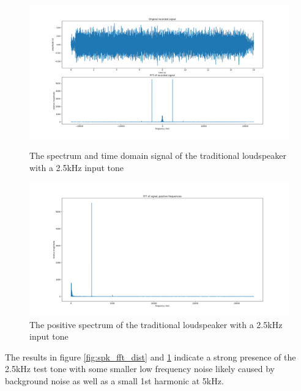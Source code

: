 \begin{figure}[ht!]
    \centering
    \begin{minipage}{0.49\textwidth}
        \centering
        \includegraphics[width=\textwidth]{Figures/Testing/Distortion/Spk_fft_sig.png}
        \caption{The spectrum and time domain signal of the traditional loudspeaker with a 2.5kHz input tone}
        \label{fig:spk_fft_dist}
    \end{minipage}\hfill
    \begin{minipage}{0.49\textwidth}
        \centering
        \includegraphics[width=\textwidth]{Figures/Testing/Distortion/Spk_fft_pos.png}
        \caption{The positive spectrum of the traditional loudspeaker with a 2.5kHz input tone}
        \label{fig:spk_fft_dist_pos}
    \end{minipage}
\end{figure}

The results in figure \ref{fig:spk_fft_dist} and \ref{fig:spk_fft_dist_pos} indicate a strong presence of the 2.5kHz test tone with some smaller low frequency noise likely caused by background noise as well as a small 1st harmonic at 5kHz.

\newpage
